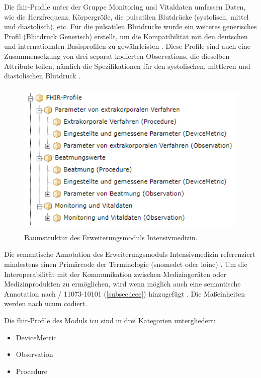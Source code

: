 Die \ac{fhir}-Profile unter der Gruppe Monitoring und Vitaldaten umfassen Daten, wie die Herzfrequenz, Körpergröße, die pulsatilen Blutdrücke (systolisch, mittel und diastolisch), etc. Für die pulsatilen Blutdrücke wurde ein weiteres generisches Profil (Blutdruck Generisch) erstellt, um die Kompatibilität mit den deutschen und internationalen Basisprofilen zu gewährleisten \cite{icukdz}. Diese Profile sind auch eine Zusammensetzung von drei separat kodierten \glqq Observations\grqq{}, die dieselben Attribute teilen, nämlich die Spezifikationen für den systolischen, mittleren und diastolischen Blutdruck \cite{icukdz}.

\begin{figure}[ht]
	\centering
	\includegraphics[height=7.5cm]{figures/icu_modul_tree}
	\caption[Baumstruktur des Erweiterungsmoduls \glqq Intensivmedizin\grqq{}]{Baumstruktur des Erweiterungsmoduls \glqq Intensivmedizin\grqq{}.}
	\label{fig:icutree}
\end{figure}

Die semantische Annotation des Erweiterungsmoduls \glqq Intensivmedizin\grqq{} referenziert mindestens einen Primärcode der Terminologie (\ac{snomedct} oder \ac{loinc}) \cite{icukdz, modicuvid}. Um die Interoperabilität mit der Kommunikation zwischen Medizingeräten oder Medizinprodukten zu ermöglichen, wird wenn möglich auch eine semantische Annotation nach / 11073-10101\texttrademark{} (\ref{subsec:ieee}) hinzugefügt \cite{icukdz}. Die Maßeinheiten werden nach \ac{ucum} codiert.

\newpage

Die \ac{fhir}-Profile des Moduls \ac{icu} sind in drei Kategorien untergliedert:

\begin{itemize}
	\item DeviceMetric
	\item Observation
	\item Procedure
\end{itemize}

